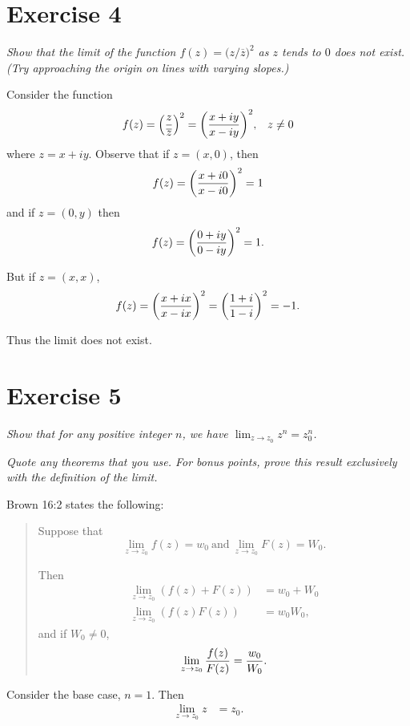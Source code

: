 \documentclass{tufte-handout}
\begin{document}
\section{Exercise 4}

\emph{Show that the limit of the function $f(z) = (z /
  \overline{z}{)}^2$ as $z$ tends to $0$ does not exist. (Try
  approaching the origin on lines with varying slopes.)}

\bigskip

Consider the function
\begin{align*}
f(z) = {\left( z \over \overline{z} \right)}^2 = {\left( x + iy \over
    x - iy \right)}^2, && z \neq 0
\end{align*}
where $z = x + iy$. Observe that if $z = (x, 0)$, then
\[
f(z) = {\left( x + i0 \over x - i0 \right)}^2 = 1
\]
and if $z = (0, y)$ then
\[
f(z) = {\left( 0 + iy \over 0 - iy \right)}^2 = 1.
\]

But if $z = (x,x)$,
\[
f(z) = {\left( x + ix \over x - ix \right)}^2 = {\left( 1 + i \over 1
    - i \right)}^2 = -1.
\]

Thus the limit does not exist.

\section{Exercise 5}

\emph{Show that for any positive integer $n$, we have $\lim_{z \to
    z_0} z^n = z_0^n$.}

\emph{Quote any theorems that you use. For bonus points, prove this result
  exclusively with the definition of the limit.}

\bigskip

\proof Brown 16:2 states the
following:

\begin{quotation}
Suppose that
\[
\lim_{z \to z_0} f(z) = w_0\ \mathrm{and}\ \lim_{z \to z_0} F(z) = W_0.
\]

Then
\begin{align*}
\lim_{z \to z_0} (f(z) + F(z)) &= w_0 + W_0\\
\lim_{z \to z_0} (f(z)F(z)) &= w_0W_0,
\end{align*}
and if $W_0 \neq 0$,
\[
\lim_{z \to z_0} {f(z) \over F(z)} = {w_0 \over W_0}.
\]
\end{quotation}

Consider the base case, $n = 1$. Then
\begin{align*}
  \lim_{z \to z_0} z &= z_0.
\end{align*}
\end{document}

